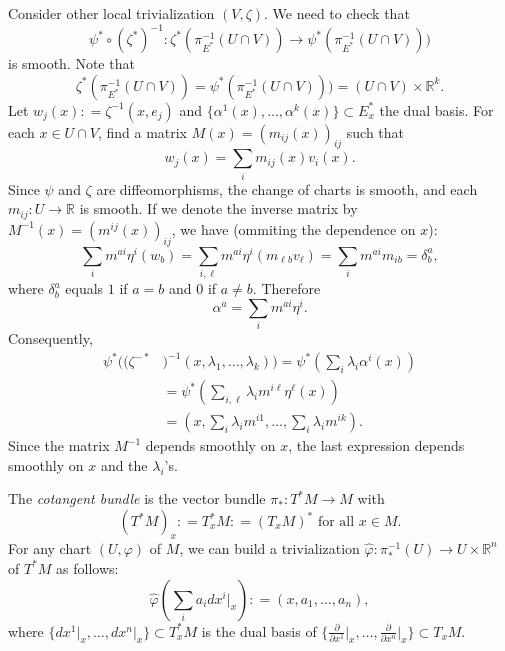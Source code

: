 \documentclass{ximera}
\begin{document}
\begin{solution}
Consider other local trivialization $(V, \zeta)$. We need to check that 
 \[\psi ^{\ast} \circ ( \zeta ^{\ast}  ) ^{-1} :  \zeta ^{\ast} (  \pi _{E^{\ast}}^{-1} (U \cap V) ) \to  \psi ^{\ast} (\pi _{E^{\ast}}^{-1} (U \cap V) ) )         \]
is smooth. Note that 
\[    \zeta ^{\ast} (  \pi _{E^{\ast}}^{-1} (U \cap V) ) = \psi ^{\ast} (\pi _{E^{\ast}}^{-1} (U \cap V) ) ) = (U \cap V ) \times \mathbb{R}^k  .        \]
Let $w_j (x) : = \zeta ^{-1} (x,e_j)$ and $\{ \alpha ^1 (x) , \ldots , \alpha ^k (x) \} \subset E_x ^{\ast}$ the dual basis. For each $x \in U \cap V$, find a matrix $M (x) = (m_{ij} (x))_{ij}$ such that
\[   w_j (x) = \sum _{i} m_{ij}(x) v_i (x)          .        \]
Since  $\psi $ and $\zeta$ are diffeomorphisms, the change of charts is smooth, and each $m_{ij} : U \to \mathbb{R}$ is smooth.  If we denote the inverse matrix by $M^{-1}(x) = (m^{ij}(x))_{ij}$, we have (ommiting the dependence on $x$):
\[     \sum _{i} m^{a i } \eta ^{i} (w_{b}) =  \sum _{i , \ell } m^{a i } \eta ^{i} (m_{\ell b} v_{\ell} ) = \sum_i  m^{ai} m_{ib} = \delta ^a_b ,                         \]
where $\delta ^a _b $ equals $1$ if $a = b$ and $0$ if $a \neq b$.  Therefore
\[     \alpha ^a = \sum _i m^{ai}\eta ^i .      \]
Consequently, 
\begin{align*}
    \psi ^{\ast} (  (\zeta ^{-\ast}&)  ^{-1}  (x, \lambda _1  , \ldots , \lambda _k )  )  = \psi ^{\ast} \left(   \sum _i \lambda _i \alpha ^i  (x)  \right) \\
    & = \psi ^{\ast} \left(   \sum _{i, \ell } \lambda _i  m^{i\ell } \eta  ^{\ell} (x)    \right)   \\
    & = \left( x, \sum_{i } \lambda_i m^{i 1} , \ldots , \sum_i \lambda _i m^{ik} \right). 
    \end{align*}
    Since the matrix $M^{-1}$ depends smoothly on $x$, the last expression depends smoothly on $x$ and the  $\lambda_i$'s. 
\end{solution}


\begin{example}
    The \emph{cotangent bundle} is the vector bundle $ \pi _{\ast} :  T^{\ast}M \to M$ with 
    \[ (T^{\ast}M)_x : =  T_x^{\ast}M    : = (T_xM)^{\ast}\text{  for all }x \in M. \]
    For any chart $(U, \varphi)$ of $M$, we can build a trivialization $ \hat{\varphi } : \pi_{\ast}^{-1}(U) \to U \times \mathbb{R}^n $ of $T^{\ast}M$ as follows:
    \[      \hat{\varphi } \left( \sum _i a_i dx^i \vert _x \right) : = ( x , a_1, \ldots , a_n  ),           \]
    where $\{ dx^1 \vert _x , \ldots , dx^n \vert _x \}  \subset T_x^{\ast}M$ is the dual basis of $\{ \tfrac{\partial}{\partial x^1} \vert _x , \ldots , \tfrac{\partial }{\partial x ^n } \vert _x \} \subset T_xM  $.  
\end{example}
\end{document}

